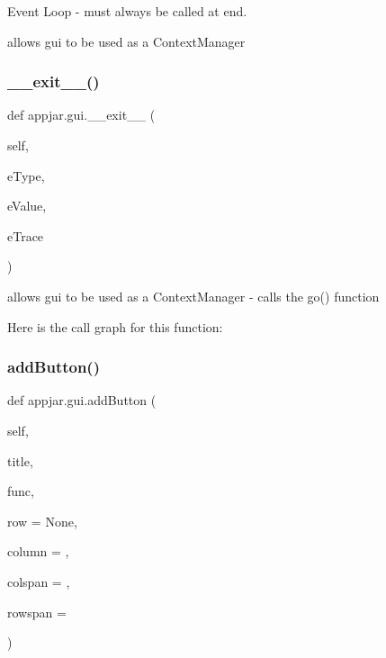 Event Loop -\/ must always be called at end. 

\begin{DoxyVerb}allows gui to be used as a ContextManager \end{DoxyVerb}
 \mbox{\label{classappjar_1_1gui_ab8813abec96530e73c4466962ccfc582}} 
\subsubsection{\texorpdfstring{\+\_\+\+\_\+exit\+\_\+\+\_\+()}{\_\_exit\_\_()}}
{\footnotesize\ttfamily def appjar.\+gui.\+\_\+\+\_\+exit\+\_\+\+\_\+ (\begin{DoxyParamCaption}\item[{}]{self,  }\item[{}]{e\+Type,  }\item[{}]{e\+Value,  }\item[{}]{e\+Trace }\end{DoxyParamCaption})}

\begin{DoxyVerb}allows gui to be used as a ContextManager
    - calls the go() function \end{DoxyVerb}
 Here is the call graph for this function\+:
\mbox{\label{classappjar_1_1gui_a2a52e7f79f582a176ec2c863b929746a}} 
\subsubsection{\texorpdfstring{add\+Button()}{addButton()}}
{\footnotesize\ttfamily def appjar.\+gui.\+add\+Button (\begin{DoxyParamCaption}\item[{}]{self,  }\item[{}]{title,  }\item[{}]{func,  }\item[{}]{row = {\ttfamily None},  }\item[{}]{column = {},  }\item[{}]{colspan = {},  }\item[{}]{rowspan = {} }\end{DoxyParamCaption})}

